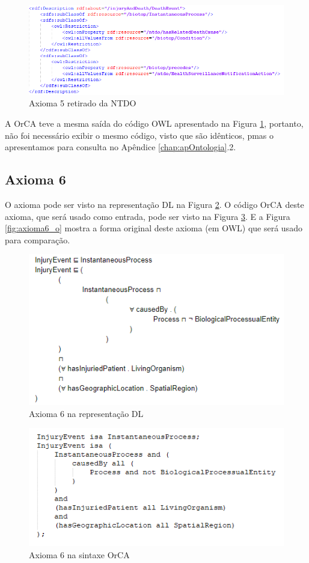 \documentclass{bcc}
\begin{document}
\begin{figure}[H]
\centering
\includegraphics[width=.8\textwidth]{Figuras/axioma5_o.png}
\caption{Axioma 5 retirado da NTDO} 
\label{fig:axioma5_o}
\end{figure}

A OrCA teve a mesma saída do código OWL apresentado na Figura \ref{fig:axioma5_o}, portanto, não foi necessário exibir o mesmo código, visto que são idênticos, pmas o apresentamos para consulta no Apêndice \ref{chap:apOntologia}.2.

\subsection{Axioma 6}
O axioma pode ser visto na representação DL na Figura \ref{fig:axioma6_dl}. O código OrCA deste axioma, que será usado como entrada, pode ser visto na Figura \ref{fig:axioma6_orca}. E a Figura \ref{fig:axioma6_o} mostra a forma original deste axioma (em OWL) que será usado para comparação. 

\begin{figure}[H]
\centering
\includegraphics[width=.7\textwidth]{Figuras/axioma6_dl.png}
\caption{Axioma 6 na representação DL} 
\label{fig:axioma6_dl}
\end{figure}

\begin{figure}[H]
\centering
\includegraphics[width=.7\textwidth]{Figuras/axioma6_orca.png}
\caption{Axioma 6 na sintaxe OrCA} 
\label{fig:axioma6_orca}
\end{figure}
\end{document}
